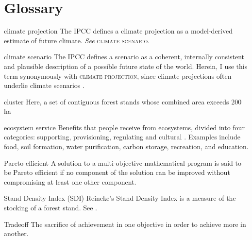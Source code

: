 
\chapter*{Glossary}      %
\thispagestyle{plain}
%
\begin{glossary}

\item[climate projection] The IPCC defines a climate projection as a model-derived estimate of future climate. \textit{See} \textsc{climate scenario}\cite{ipcc2013Definition}.

\item[climate scenario] The IPCC defines a scenario as a coherent, internally consistent and plausible description of a possible future state of the world. Herein, I use this term synonymously with \textsc{climate projection}, since climate projections often underlie climate scenarios \cite{ipcc2013Definition}.

\item[cluster] Here, a set of contiguous forest stands whose combined area exceeds 200 ha

\item[ecosystem service] Benefits that people receive from ecosystems, divided into four categories: supporting, provisioning, regulating and cultural \cite{assessment2005ecosystems}. Examples include food, soil formation, water purification, carbon storage, recreation, and education.

\item[Pareto efficient] A solution to a multi-objective mathematical program is said to be Pareto efficient if no component of the solution can be improved without compromising at least one other component.

\item[Stand Density Index (SDI)] Reineke's Stand Density Index is a measure of the stocking of a forest stand. See \cite{reineke1933perfecting}.

\item[Tradeoff] The sacrifice of achievement in one objective in order to achieve more in another.
 
\end{glossary}